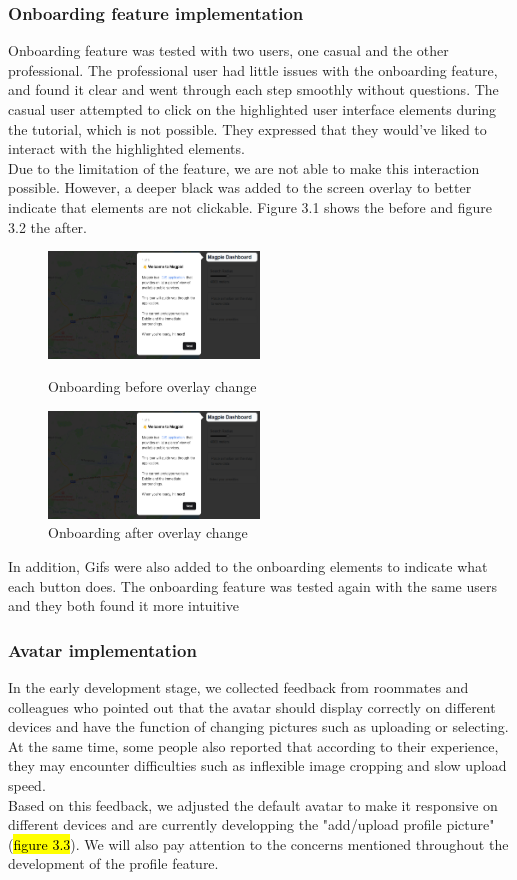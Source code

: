 \documentclass{report}
\begin{document}
\subsubsection{Onboarding feature implementation}
Onboarding feature was tested with two users, one casual and the other professional. The professional user had little issues with the onboarding
feature, and found it clear and went through each step smoothly without questions. The casual user attempted to click on the highlighted user
interface elements during the tutorial, which is not possible. They expressed that they would've liked to interact with the highlighted elements.\\
Due to the limitation of the feature, we are not able to make this interaction possible. However, a deeper black was added to the screen overlay to better indicate
that elements are not clickable. Figure 3.1 shows the before and figure 3.2 the after. \\
\begin{figure}
    \centering
    \includegraphics[width=0.5\textwidth]{Figures/fig10.png}
    \caption{Onboarding before overlay change}                        \includegraphics[width=0.5\textwidth]{Figures/fig11.png}
    \caption{Onboarding after overlay change}
\end{figure}
In addition, Gifs were also added to the onboarding elements to indicate what each
button does. The onboarding feature was tested again with the same users and
they both found it more intuitive

\subsubsection{Avatar implementation}
In the early development stage, we collected feedback from roommates and colleagues who pointed out that the avatar should display correctly on different devices and have the function of changing pictures such as uploading or selecting.
At the same time, some people also reported that according to their experience, they may encounter difficulties such as inflexible image cropping and slow upload speed.\\
Based on this feedback, we adjusted the default avatar to make it responsive on different devices and are currently developping the "add/upload profile picture"(\hl{figure 3.3}). We will also pay attention to the concerns mentioned throughout the development of the profile feature.
\end{document}
